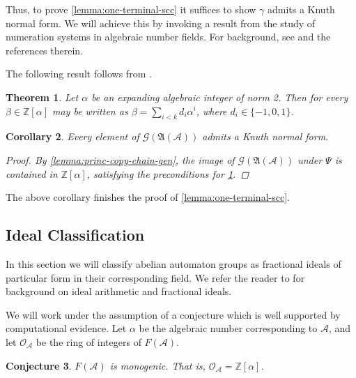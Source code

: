 \documentclass[12pt, letterpaper]{article}
\newcommand{\Z}{\mathbb Z}
\newcommand{\A}{\mathcal A}
\newcommand{\princ}{\mathfrak A}
\newcommand{\gp}{\mathcal G}
\newtheorem{thm}{Theorem}[section]
\newtheorem{cor}[thm]{Corollary}
\newtheorem{conj}[thm]{Conjecture}
\begin{document}
Thus, to prove \cref{lemma:one-terminal-scc} it suffices to show $\gamma$
admits a Knuth normal form. We will achieve this by invoking a result from the
study of numeration systems in algebraic number fields. For background,
see \cite{Pethoe09:radix_representations} and the references therein.

The following result follows from \cite{LagariasWang96:tiles,
    LagariasWang97:integral_tiles}.
\begin{thm}\label{thm:lagarias_wang}
    Let $\alpha$ be an expanding algebraic integer of norm 2. Then for every
    $\beta \in \Z[\alpha]$ may be written as
    $\beta = \sum_{i < k} d_i \alpha^i$, where $d_i \in \{-1, 0, 1\}$.
\end{thm}

\begin{cor}\label{cor:principal-tame}
    Every element of $\gp(\princ(\A))$ admits a Knuth normal form.
    \begin{proof}
        By \cref{lemma:princ-copy-chain-gen}, the image of $\gp(\princ(\A))$
        under $\Psi$ is contained in $\Z[\alpha]$, satisfying the preconditions
        for \cref{thm:lagarias_wang}.
    \end{proof}
\end{cor}

The above corollary finishes the proof of \cref{lemma:one-terminal-scc}.

\subsection{Ideal Classification}\label{sec:ideal-rep-classification}
In this section we will classify abelian automaton groups as fractional ideals
of particular form in their corresponding field. We refer the reader to
\cite{stein2012algebraic} for background on ideal arithmetic and fractional
ideals.

We will work under the assumption of a conjecture which is well supported by
computational evidence.  Let $\alpha$ be the algebraic number corresponding to
$\A$, and let $\mathcal{O}_\A$ be the ring of integers of $F(\A)$.
\begin{conj}\label{conj:power_basis}
    $F(\A)$ is monogenic. That is, $\mathcal{O}_\A = \Z[\alpha]$.
\end{conj}
\end{document}
